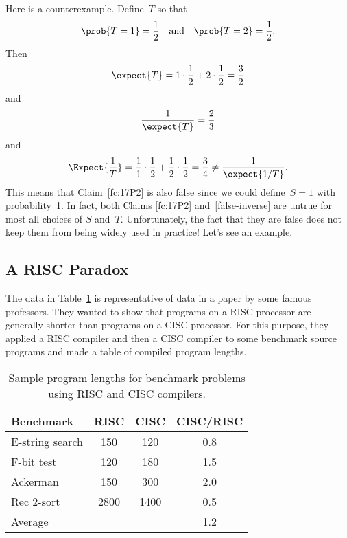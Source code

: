Here is a counterexample.  Define~$T$ so that
\begin{equation*}
    \prob{T = 1} = \frac{1}{2} \quad\text{and}\quad
    \prob{T = 2} = \frac{1}{2}.
\end{equation*}
Then
\begin{equation*}
    \expect{T} = 1 \cdot \frac{1}{2} + 2 \cdot \frac{1}{2} =
    \frac{3}{2}
\end{equation*}
and
\begin{equation*}
    \frac{1}{\expect{T}} = \frac{2}{3}
\end{equation*}
and
\begin{equation*}
\Expect{\frac{1}{T}}
    = \frac{1}{1} \cdot \frac{1}{2} + \frac{1}{2} \cdot \frac{1}{2}
    = \frac{3}{4} 
    \ne \frac{1}{\expect{1/T}}.
\end{equation*}
This means that Claim~\ref{fc:17P2} is also false since we could
define~$S = 1$ with probability~1.  In fact, both Claims \ref{fc:17P2}
and~\ref{false-inverse} are untrue for most all choices of $S$
and~$T$.  Unfortunately, the fact that they are false does not keep
them from being widely used in practice!  Let's see an example.

\subsection{A RISC Paradox}

The data in Table~\ref{fig:17P4} is representative of data in a paper
by some famous professors.  They wanted to show that programs on a
RISC processor are generally shorter than programs on a CISC
processor.  For this purpose, they applied a RISC compiler and then a
CISC compiler to some benchmark source programs and made a table of
compiled program lengths.

\begin{table}

\begin{tabular}{lccc}
Benchmark        & RISC          & CISC          & CISC/RISC\\
\hline
E-string search  & 150           & 120           & 0.8 \\
F-bit test       & 120           & 180           & 1.5 \\
Ackerman         & 150           & 300           & 2.0 \\
Rec 2-sort       & 2800          & 1400          & 0.5 \\
\hline
Average          &               &               & 1.2
\end{tabular}

\caption{Sample program lengths for benchmark problems using RISC and
  CISC compilers.}

\label{fig:17P4}

\end{table}

